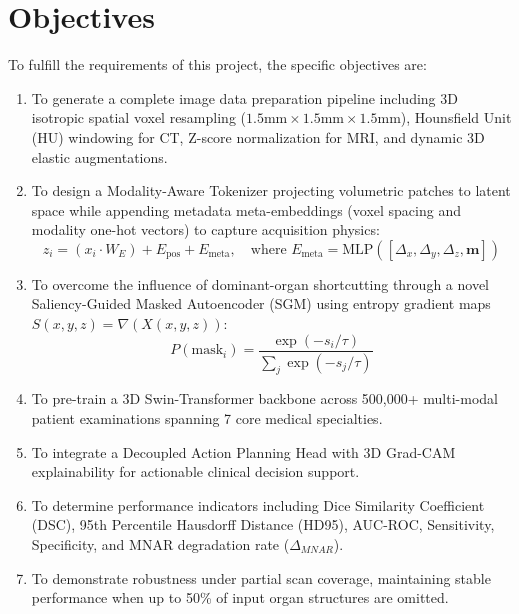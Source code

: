 \documentclass[11pt,a4paper]{article}
\begin{document}
\section{Objectives}
To fulfill the requirements of this project, the specific objectives are:
\begin{enumerate}[label=\roman*.]
    \item To generate a complete image data preparation pipeline including 3D isotropic spatial voxel resampling ($1.5\text{mm} \times 1.5\text{mm} \times 1.5\text{mm}$), Hounsfield Unit (HU) windowing for CT, Z-score normalization for MRI, and dynamic 3D elastic augmentations.
    \item To design a Modality-Aware Tokenizer projecting volumetric patches to latent space while appending metadata meta-embeddings (voxel spacing and modality one-hot vectors) to capture acquisition physics:
    \begin{equation}
        z_i = (x_i \cdot W_E) + E_{\text{pos}} + E_{\text{meta}}, \quad \text{where } E_{\text{meta}} = \text{MLP}\left([\Delta_x, \Delta_y, \Delta_z, \mathbf{m}]\right)
    \end{equation}
    \item To overcome the influence of dominant-organ shortcutting through a novel Saliency-Guided Masked Autoencoder (SGM) using entropy gradient maps $S(x,y,z) = \nabla(X(x,y,z))$:
    \begin{equation}
        P(\text{mask}_i) = \frac{\exp(-s_i / \tau)}{\sum_j \exp(-s_j / \tau)}
    \end{equation}
    \item To pre-train a 3D Swin-Transformer backbone across 500,000+ multi-modal patient examinations spanning 7 core medical specialties.
    \item To integrate a Decoupled Action Planning Head with 3D Grad-CAM explainability for actionable clinical decision support.
    \item To determine performance indicators including Dice Similarity Coefficient (DSC), 95th Percentile Hausdorff Distance (HD95), AUC-ROC, Sensitivity, Specificity, and MNAR degradation rate ($\Delta_{MNAR}$).
    \item To demonstrate robustness under partial scan coverage, maintaining stable performance when up to 50\% of input organ structures are omitted.
\end{enumerate}
\end{document}
